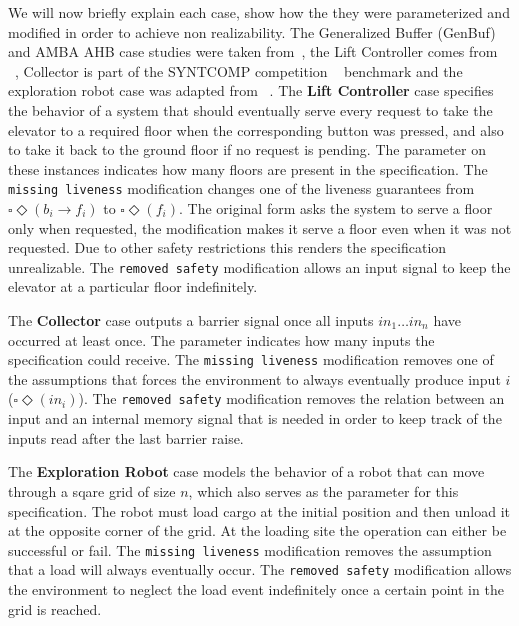We will now briefly explain each case, show how the they were parameterized and modified in order to achieve non realizability. The Generalized Buffer (GenBuf) and AMBA AHB case studies were taken from~\cite{DBLP:conf/hvc/KonighoferHB10}, the Lift Controller comes from ~\cite{DBLP:conf/fmcad/AlurMT13}, Collector is part of the SYNTCOMP competition ~\cite{SYNTCOMP} benchmark and the exploration robot case was adapted from ~\cite{DBLP:journals/corr/abs-2001-07678}. 
The \textbf{Lift Controller} case specifies the behavior of a system that should eventually serve every request to take the elevator to a required floor when the corresponding button was pressed, and also to take it back to the ground floor if no request is pending. The parameter on these instances indicates how many floors are present in the specification. The \texttt{missing liveness} modification changes one of the liveness guarantees from $\square \Diamond (b_i \rightarrow f_i)$ to $\square \Diamond (f_i)$. The original form asks the system to serve a floor only when requested, the modification makes it serve a floor even when it was not requested. Due to other safety restrictions this renders the specification unrealizable. The \texttt{removed safety} modification allows an input signal to keep the elevator at a particular floor indefinitely.

The \textbf{Collector} case outputs a barrier signal once all inputs $in_1\ldots in_n$ have occurred at least once. The parameter indicates how many inputs the specification could receive. The \texttt{missing liveness} modification removes one of the assumptions that forces the environment to always eventually produce input $i$ ($\square\Diamond(in_i)$). The \texttt{removed safety} modification removes the relation between an input and an internal memory signal that is needed in order to keep track of the inputs read after the last barrier raise.

The \textbf{Exploration Robot} case models the behavior of a robot that can move through a sqare grid of size $n$, which also serves as the parameter for this specification. The robot must load cargo at the initial position and then unload it at the opposite corner of the grid. At the loading site the operation can either be successful or fail. The \texttt{missing liveness} modification removes the assumption that a load will always eventually occur. The \texttt{removed safety} modification allows the environment to neglect the load event indefinitely once a certain point in the grid is reached.

